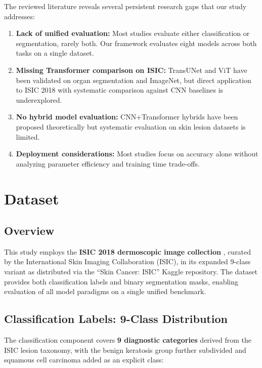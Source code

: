 \documentclass[10pt,twocolumn]{article}
\begin{document}
The reviewed literature reveals several persistent research gaps that our study addresses:

\begin{enumerate}
  \item \textbf{Lack of unified evaluation:} Most studies evaluate either classification or segmentation, rarely both. Our framework evaluates eight models across both tasks on a single dataset.
  \item \textbf{Missing Transformer comparison on ISIC:} TransUNet and ViT have been validated on organ segmentation and ImageNet, but direct application to ISIC 2018 with systematic comparison against CNN baselines is underexplored.
  \item \textbf{No hybrid model evaluation:} CNN+Transformer hybrids have been proposed theoretically but systematic evaluation on skin lesion datasets is limited.
  \item \textbf{Deployment considerations:} Most studies focus on accuracy alone without analyzing parameter efficiency and training time trade-offs.
\end{enumerate}

\section{Dataset}

\subsection{Overview}

This study employs the \textbf{ISIC 2018 dermoscopic image collection} \cite{Codella2018, Tschandl2018}, curated by the International Skin Imaging Collaboration (ISIC), in its expanded 9-class variant as distributed via the ``Skin Cancer: ISIC'' Kaggle repository. The dataset provides both classification labels and binary segmentation masks, enabling evaluation of all model paradigms on a single unified benchmark.

\subsection{Classification Labels: 9-Class Distribution}

The classification component covers \textbf{9 diagnostic categories} derived from the ISIC lesion taxonomy, with the benign keratosis group further subdivided and squamous cell carcinoma added as an explicit class:
\end{document}
